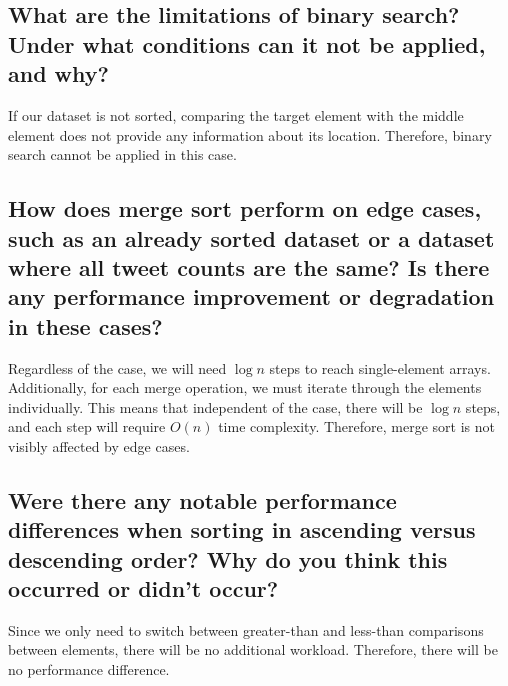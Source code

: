 \subsection*{What are the limitations of binary search? Under what conditions can it not be applied, and why?}

If our dataset is not sorted, comparing the target element with the middle element does not provide any information about its location. Therefore, binary search cannot be applied in this case.

\subsection*{How does merge sort perform on edge cases, such as an already sorted dataset or a dataset where all tweet counts are the same? Is there any performance improvement or degradation in these cases?}

Regardless of the case, we will need \(\log n\) steps to reach single-element arrays. Additionally, for each merge operation, we must iterate through the elements individually. This means that independent of the case, there will be \(\log n\) steps, and each step will require \(O(n)\) time complexity. Therefore, merge sort is not visibly affected by edge cases.

\subsection*{Were there any notable performance differences when sorting in ascending versus descending order? Why do you think this occurred or didn’t occur?}

Since we only need to switch between greater-than and less-than comparisons between elements, there will be no additional workload. Therefore, there will be no performance difference.